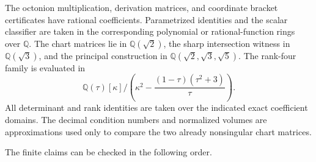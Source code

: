 \documentclass[11pt,a4paper]{article}
\begin{document}
The octonion multiplication, derivation matrices, and coordinate bracket certificates have rational coefficients.  Parametrized identities and the scalar classifier are taken in the corresponding polynomial or rational-function rings over $\mathbb Q$.  The chart matrices lie in $\mathbb Q(\sqrt2)$, the sharp intersection witness in $\mathbb Q(\sqrt3)$, and the principal construction in $\mathbb Q(\sqrt2,\sqrt3,\sqrt5)$.  The rank-four family is evaluated in
\[
\mathbb Q(\tau)[\kappa]\Big/\left(\kappa^2-\frac{(1-\tau)(\tau^2+3)}{\tau}\right).
\]
All determinant and rank identities are taken over the indicated exact coefficient domains.  The decimal condition numbers and normalized volumes are approximations used only to compare the two already nonsingular chart matrices.

The finite claims can be checked in the following order.
\end{document}
